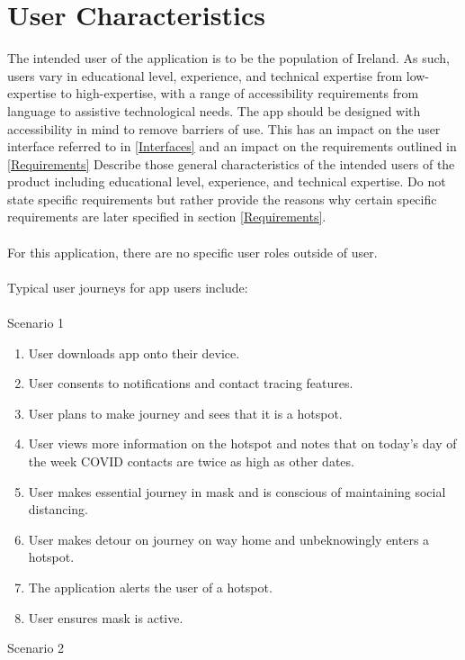 \documentclass{scrreprt}
\begin{document}
\section{User Characteristics}

The intended user of the application is to be the population of Ireland. As such, users vary in educational level, experience, and technical expertise from low-expertise to high-expertise, with a range of accessibility requirements from language to assistive technological needs. The app should be designed with accessibility in mind to remove barriers of use. This has an impact on the user interface referred to in \ref{Interfaces} and an impact on the requirements outlined in \ref{Requirements}
Describe those general characteristics of the intended users of the product including educational level, experience, and technical expertise.  Do not state specific requirements but rather provide the reasons why certain specific requirements are later specified in section \ref{Requirements}. \\
\\
For this application, there are no specific user roles outside of user.\\
\\
Typical user journeys for app users include:\\
\\
Scenario 1
\begin{enumerate}
	\item User downloads app onto their device.
	\item User consents to notifications and contact tracing features.
	\item User plans to make journey and sees that it is a hotspot.
	\item User views more information on the hotspot and notes that on today's day of the week COVID contacts are twice as high as other dates.
	\item User makes essential journey in mask and is conscious of maintaining social distancing.
	\item User makes detour on journey on way home and unbeknowingly enters a hotspot. 
	\item The application alerts the user of a hotspot.
	\item User ensures mask is active.
\end{enumerate}
Scenario 2
\end{document}
